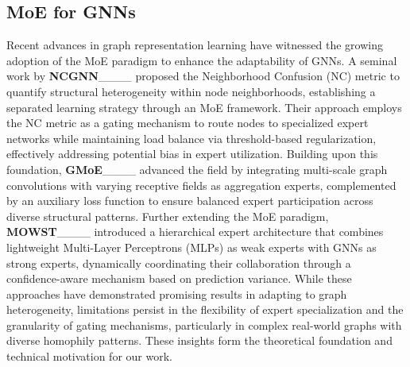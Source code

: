 \subsection{MoE for GNNs}
Recent advances in graph representation learning have witnessed the growing adoption of the MoE paradigm to enhance the adaptability of GNNs. A seminal work by \textbf{NCGNN}____ proposed the Neighborhood Confusion (NC) metric to quantify structural heterogeneity within node neighborhoods, establishing a separated learning strategy through an MoE framework. Their approach employs the NC metric as a gating mechanism to route nodes to specialized expert networks while maintaining load balance via threshold-based regularization, effectively addressing potential bias in expert utilization. Building upon this foundation, \textbf{GMoE}____ advanced the field by integrating multi-scale graph convolutions with varying receptive fields as aggregation experts, complemented by an auxiliary loss function to ensure balanced expert participation across diverse structural patterns. Further extending the MoE paradigm, \textbf{MOWST}____ introduced a hierarchical expert architecture that combines lightweight Multi-Layer Perceptrons (MLPs) as weak experts with GNNs as strong experts, dynamically coordinating their collaboration through a confidence-aware mechanism based on prediction variance. While these approaches have demonstrated promising results in adapting to graph heterogeneity, limitations persist in the flexibility of expert specialization and the granularity of gating mechanisms, particularly in complex real-world graphs with diverse homophily patterns. These insights form the theoretical foundation and technical motivation for our work.